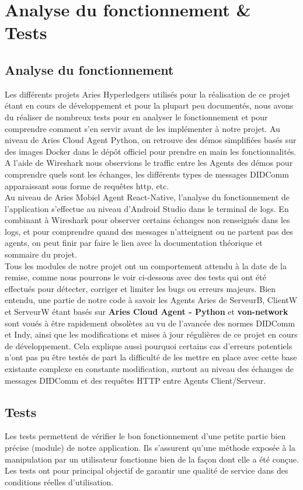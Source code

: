 \documentclass[12pt, openany]{report}
\begin{document}
\section{Analyse du fonctionnement \& Tests}
\noindent 
\begin{flushleft}

\subsection{Analyse du fonctionnement}
Les différents projets Aries Hyperledgers utilisés pour la réalisation de ce projet étant en cours de développement et pour la plupart peu documentés, nous avons du réaliser de nombreux tests pour en analyser le fonctionnement et pour comprendre comment s'en servir avant de les implémenter à notre projet. Au niveau de Aries Cloud Agent Python, on retrouve des démos simplifiées basés sur des images Docker dans le dépôt officiel pour prendre en main les fonctionnalités. A l'aide de Wireshark nous observions le traffic entre les Agents des démos pour comprendre quels sont les échanges, les différents types de messages DIDComm apparaissant sous forme de requêtes http, etc.\\
Au niveau de Aries Mobiel Agent React-Native, l'analyse du fonctionnement de l'application s'effectue au niveau d'Android Studio dans le terminal de logs. En combinant à Wireshark pour observer certains échanges non renseignés dans les logs, et pour comprendre quand des messages n'atteignent ou ne partent pas des agents, on peut finir par faire le lien avec la documentation théorique et sommaire du projet.\\
Tous les modules de notre projet ont un comportement attendu à la date de la remise, comme nous pourrons le voir ci-dessous avec des tests qui ont été effectués pour détecter, corriger et limiter les bugs ou erreurs majeurs.
Bien entendu, une partie de notre code à savoir les Agents Aries de ServeurB, ClientW et ServeurW étant basés sur \textbf{Aries Cloud Agent - Python} et \textbf{von-network} sont voués à être rapidement obsolètes au vu de l'avancée des normes DIDComm et Indy, ainsi que les modifications et mises à jour régulières de ce projet en cours de développement. Cela explique aussi pourquoi certains cas d'erreurs potentiels n'ont pas pu être testés de part la difficulté de les mettre en place avec cette base existante complexe en constante modification, surtout au niveau des échanges de messages DIDComm et des requêtes HTTP entre Agents Client/Serveur.
\subsection{Tests}
Les tests permettent de vérifier le bon fonctionnement d’une petite partie bien précise (module) de notre application. Ils s'assurent qu'une méthode exposée à la manipulation par un utilisateur fonctionne bien de la façon dont elle a été conçue.
Les tests ont pour principal objectif de garantir une qualité de service dans des conditions réelles d'utilisation.

\end{flushleft}
\end{document}
